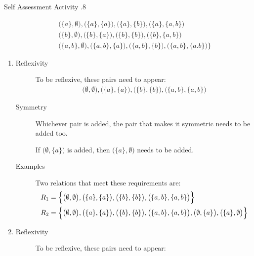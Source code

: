 \documentclass[../notes.tex]{subfiles}
\begin{document}
\begin{exercise}{Self Assessment Activity \thechapter.8}
\begin{enumerate}
\begin{align*}
									& \quad \bigl(\{a\}, \emptyset\bigr), \bigl(\{a\}, \{a\}\bigr), \bigl(\{a\}, \{b\}\bigr), \bigl(\{a\}, \{a, b\}\bigr)\\
									& \quad \bigl(\{b\}, \emptyset\bigr), \bigl(\{b\}, \{a\}\bigr), \bigl(\{b\}, \{b\}\bigr), \bigl(\{b\}, \{a, b\}\bigr)\\
									& \quad \bigl(\{a, b\}, \emptyset\bigr), \bigl(\{a, b\}, \{a\}\bigr), \bigl(\{a, b\}, \{b\}\bigr), \bigl(\{a, b\}, \{a. b\}\bigr)
								\Bigr\}
							\end{align*}
							\begin{enumerate}[label=(\alph*)]
								\item {}
									\begin{description}
										\item[Reflexivity] To be reflexive, these pairs need to appear:
											\begin{align*}
												\bigl(\emptyset, \emptyset\bigr), \bigl(\{a\}, \{a\}\bigr), \bigl(\{b\}, \{b\}\bigr), \bigl(\{a, b\}, \{a, b\}\bigr)
											\end{align*}
										\item[Symmetry] Whichever pair is added, the pair that makes it symmetric needs to be added too.
											\begin{indentparagraph}
												If $\bigl(\emptyset, \{a\}\bigr)$ is added, then $\bigl(\{a\}, \emptyset\bigr)$ needs to be added.
											\end{indentparagraph}
										\item[Examples] Two relations that meet these requirements are:
											\begin{align*}
												R_{1} &= \Bigl\{\bigl(\emptyset, \emptyset\bigr), \bigl(\{a\}, \{a\}\bigr), \bigl(\{b\}, \{b\}\bigr), \bigl(\{a, b\}, \{a, b\}\bigr)\Bigr\}\\
												R_{2} &= \Bigl\{\bigl(\emptyset, \emptyset\bigr), \bigl(\{a\}, \{a\}\bigr), \bigl(\{b\}, \{b\}\bigr), \bigl(\{a, b\}, \{a, b\}\bigr), \bigl(\emptyset, \{a\}\bigr), \bigl(\{a\}, \emptyset\bigr)\Bigr\}
											\end{align*}
									\end{description}
								\item {}
									\begin{description}
										\item[Reflexivity] To be reflexive, these pairs need to appear:

\end{description}
\end{enumerate}
\end{enumerate}
\end{exercise}
\end{document}
